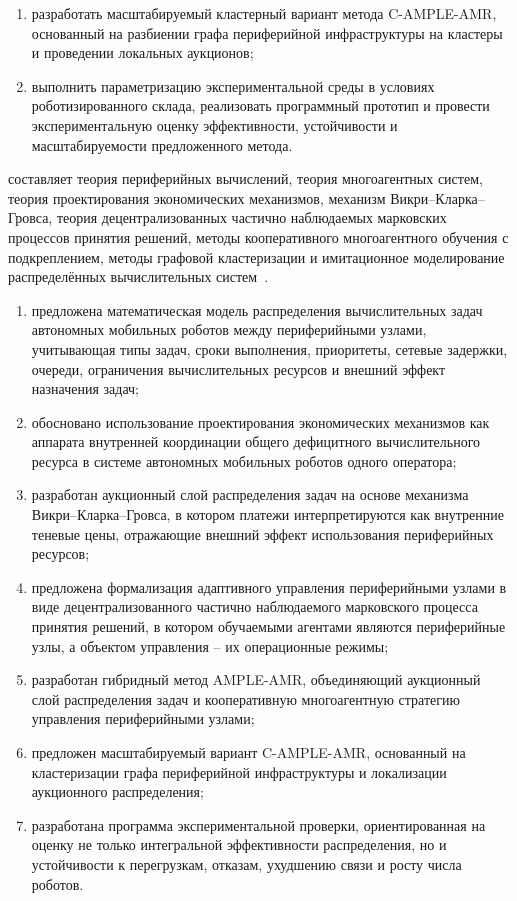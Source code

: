 \begin{enumerate}
	\item разработать масштабируемый кластерный вариант метода C-AMPLE-AMR, основанный на разбиении графа периферийной инфраструктуры на кластеры и проведении локальных аукционов;
	\item выполнить параметризацию экспериментальной среды в условиях роботизированного склада, реализовать программный прототип и провести экспериментальную оценку эффективности, устойчивости и масштабируемости предложенного метода.
\end{enumerate}

\methods составляет теория периферийных вычислений, теория многоагентных систем, теория проектирования экономических механизмов, механизм Викри--Кларка--Гровса, теория децентрализованных частично наблюдаемых марковских процессов принятия решений, методы кооперативного многоагентного обучения с подкреплением, методы графовой кластеризации и имитационное моделирование распределённых вычислительных систем~\cite{Oliehoek2016DecPOMDP,Bernstein2002Complexity,Rashid2018QMIX,Karypis1998Metis,Blondel2008Louvain,NisanRonen2001AMD}.

\novelty
\begin{enumerate}
    \item предложена математическая модель распределения вычислительных задач автономных мобильных роботов между периферийными узлами, учитывающая типы задач, сроки выполнения, приоритеты, сетевые задержки, очереди, ограничения вычислительных ресурсов и внешний эффект назначения задач;
	\item обосновано использование проектирования экономических механизмов как аппарата внутренней координации общего дефицитного вычислительного ресурса в системе автономных мобильных роботов одного оператора;
	\item разработан аукционный слой распределения задач на основе механизма Викри--Кларка--Гровса, в котором платежи интерпретируются как внутренние теневые цены, отражающие внешний эффект использования периферийных ресурсов;
	\item предложена формализация адаптивного управления периферийными узлами в виде децентрализованного частично наблюдаемого марковского процесса принятия решений, в котором обучаемыми агентами являются периферийные узлы, а объектом управления -- их операционные режимы;
	\item разработан гибридный метод AMPLE-AMR, объединяющий аукционный слой распределения задач и кооперативную многоагентную стратегию управления периферийными узлами;
	\item предложен масштабируемый вариант C-AMPLE-AMR, основанный на кластеризации графа периферийной инфраструктуры и локализации аукционного распределения;
	\item разработана программа экспериментальной проверки, ориентированная на оценку не только интегральной эффективности распределения, но и устойчивости к перегрузкам, отказам, ухудшению связи и росту числа роботов.
\end{enumerate}

